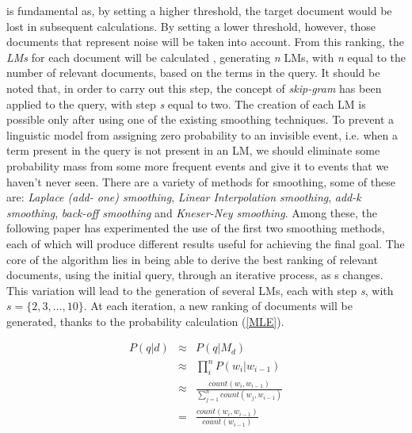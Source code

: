is fundamental as, by setting a higher threshold, the target document would 
be lost in subsequent calculations. By setting a lower threshold, however, 
those documents that represent noise will be taken into account. From this 
ranking, the \emph{LMs} for each document will be calculated \cite{10}, generating \emph{n} LMs, 
with \emph{n} equal to the number of relevant documents, based on the terms in the 
query. It should be noted that, in order to carry out this step, the concept 
of \emph{skip-gram} has been applied to the query, with step \emph{s} equal to two. The 
creation of each LM is possible only after using one of the existing smoothing 
techniques. To prevent a linguistic model from assigning zero probability to 
an invisible event, i.e. when a term present in the query is not present in 
an LM, we should eliminate some probability mass from some more frequent 
events and give it to events that we haven't never seen. There 
are a variety of methods for smoothing, some of these are: \emph{Laplace (add-
one) smoothing}, \emph{Linear Interpolation smoothing}, \emph{add-k smoothing}, \emph{back-off 
smoothing} and \emph{Kneser-Ney smoothing}. Among these, the following paper 
has experimented the use of the first two smoothing methods, each of which 
will produce different results useful for achieving the final goal. The core of 
the algorithm lies in being able to derive the best ranking of relevant documents, 
using the initial query, through an iterative process, as s changes. 
This variation will lead to the generation of several LMs, each with step \emph{s}, 
with $s=\{2,3,\ldots,10\}$. At each iteration, a new ranking of documents will 
be generated, thanks to the probability calculation (\ref{MLE}).

\begin{eqnarray}\label{MLE}
    P(q|d) & \approx & P(q|M_d) \nonumber \\
           & \approx & \prod_i^n{P(w_i|w_{i-1})} \nonumber \\
           & \approx & \frac{count(w_i,w_{i-1})}{\sum_{j=1}^n count(w_j,w_{i-1})} \nonumber \\
           & = & \frac{count(w_i, w_{i-1})}{count(w_{i-1})}
\end{eqnarray}